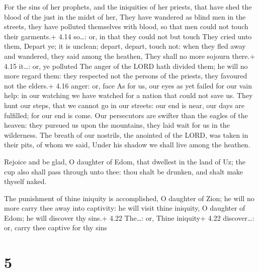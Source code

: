  For the sins of her prophets, and the iniquities of her
priests, that have shed the blood of the just in the midst of her,
 They have wandered as blind men in the streets, they have
polluted themselves with blood, so that men could not touch their
garments.+ 4.14 so\ldots: or, in that they could not but touch
 They cried unto them, Depart ye; it is unclean; depart,
depart, touch not: when they fled away and wandered, they said among the
heathen, They shall no more sojourn there.+ 4.15 it\ldots: or, ye
polluted  The anger of the LORD hath divided them; he will
no more regard them: they respected not the persons of the priests, they
favoured not the elders.+ 4.16 anger: or, face  As for us,
our eyes as yet failed for our vain help: in our watching we have
watched for a nation that could not save us.  They hunt our
steps, that we cannot go in our streets: our end is near, our days are
fulfilled; for our end is come.  Our persecutors are
swifter than the eagles of the heaven: they pursued us upon the
mountains, they laid wait for us in the wilderness.  The
breath of our nostrils, the anointed of the LORD, was taken in their
pits, of whom we said, Under his shadow we shall live among the heathen.

 Rejoice and be glad, O daughter of Edom, that dwellest
in the land of Uz; the cup also shall pass through unto thee: thou shalt
be drunken, and shalt make thyself naked.

 The punishment of thine iniquity is accomplished, O
daughter of Zion; he will no more carry thee away into captivity: he
will visit thine iniquity, O daughter of Edom; he will discover thy
sins.+ 4.22 The\ldots: or, Thine iniquity+ 4.22 discover\ldots: or,
carry thee captive for thy sins

\hypertarget{section-4}{%
\section{5}\label{section-4}}

